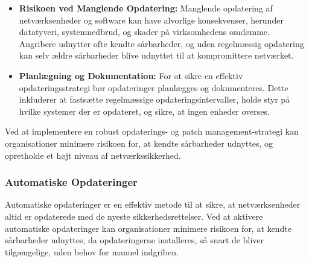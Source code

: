 \begin{itemize}
	\item \textbf{Risikoen ved Manglende Opdatering:} Manglende opdatering af netværksenheder og software kan have alvorlige konsekvenser, herunder datatyveri, systemnedbrud, og skader på virksomhedens omdømme. Angribere udnytter ofte kendte sårbarheder, og uden regelmæssig opdatering kan selv ældre sårbarheder blive udnyttet til at kompromittere netværket.
	
	\item \textbf{Planlægning og Dokumentation:} For at sikre en effektiv opdateringsstrategi bør opdateringer planlægges og dokumenteres. Dette inkluderer at fastsætte regelmæssige opdateringsintervaller, holde styr på hvilke systemer der er opdateret, og sikre, at ingen enheder overses.
\end{itemize}
\noindent
Ved at implementere en robust opdaterings- og patch management-strategi kan organisationer minimere risikoen for, at kendte sårbarheder udnyttes, og opretholde et højt niveau af netværkssikkerhed.


\subsubsection{Automatiske Opdateringer}
Automatiske opdateringer er en effektiv metode til at sikre, at netværksenheder altid er opdaterede med de nyeste sikkerhedsrettelser. Ved at aktivere automatiske opdateringer kan organisationer minimere risikoen for, at kendte sårbarheder udnyttes, da opdateringerne installeres, så snart de bliver tilgængelige, uden behov for manuel indgriben.

